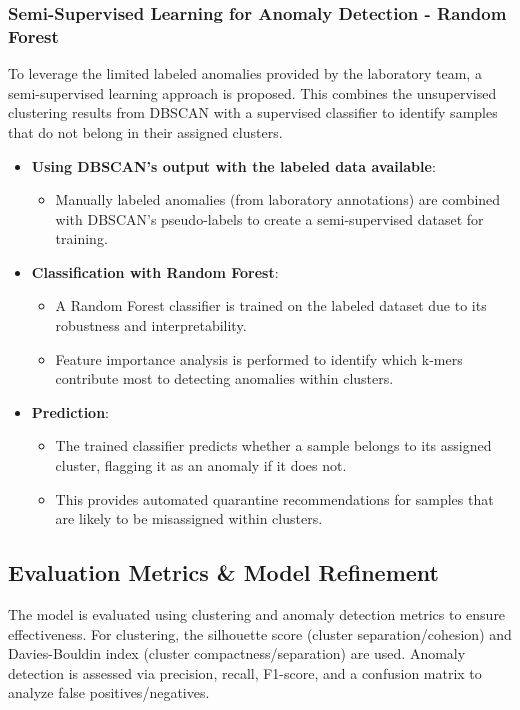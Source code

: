 \subsubsection{Semi-Supervised Learning for Anomaly Detection - Random Forest}
To leverage the limited labeled anomalies provided by the laboratory team, a semi-supervised learning approach is proposed. This combines the unsupervised clustering results from DBSCAN with a supervised classifier to identify samples that do not belong in their assigned clusters.

\begin{itemize}
    \item \textbf{Using DBSCAN's output with the labeled data available}:
    \begin{itemize}
        \item Manually labeled anomalies (from laboratory annotations) are combined with DBSCAN’s pseudo-labels to create a semi-supervised dataset for training.
    \end{itemize}

    \item \textbf{Classification with Random Forest}:
    \begin{itemize}
        \item A Random Forest classifier is trained on the labeled dataset due to its robustness and interpretability.
        \item Feature importance analysis is performed to identify which k-mers contribute most to detecting anomalies within clusters.
    \end{itemize}

    \item \textbf{Prediction}:
    \begin{itemize}
        \item The trained classifier predicts whether a sample belongs to its assigned cluster, flagging it as an anomaly if it does not.
        \item This provides automated quarantine recommendations for samples that are likely to be misassigned within clusters.
    \end{itemize}
\end{itemize}

\subsection{Evaluation Metrics \& Model Refinement}
The model is evaluated using clustering and anomaly detection metrics to ensure effectiveness. For clustering, the silhouette score (cluster separation/cohesion) and Davies-Bouldin index (cluster compactness/separation) are used. Anomaly detection is assessed via precision, recall, F1-score, and a confusion matrix to analyze false positives/negatives. 

